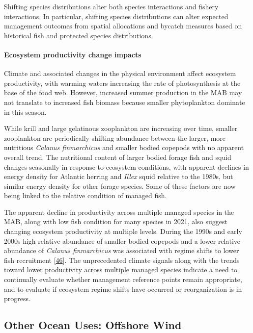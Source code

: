 \documentclass[
  10pt,
]{article}
\begin{document}
Shifting species distributions alter both species interactions and
fishery interactions. In particular, shifting species distributions can
alter expected management outcomes from spatial allocations and bycatch
measures based on historical fish and protected species distributions.

\hypertarget{ecosystem-productivity-change-impacts}{%
\paragraph{Ecosystem productivity change
impacts}\label{ecosystem-productivity-change-impacts}}

Climate and associated changes in the physical environment affect
ecosystem productivity, with warming waters increasing the rate of
photosynthesis at the base of the food web. However, increased summer
production in the MAB may not translate to increased fish biomass
because smaller phytoplankton dominate in this season.

While krill and large gelatinous zooplankton are increasing over time,
smaller zooplankton are periodically shifting abundance between the
larger, more nutritious \emph{Calanus finmarchicus} and smaller bodied
copepods with no apparent overall trend. The nutritional content of
larger bodied forage fish and squid changes seasonally in response to
ecosystem conditions, with apparent declines in energy density for
Atlantic herring and \emph{Illex} squid relative to the 1980s, but
similar energy density for other forage species. Some of these factors
are now being linked to the relative condition of managed fish.

The apparent decline in productivity across multiple managed species in
the MAB, along with low fish condition for many species in 2021, also
suggest changing ecosystem productivity at multiple levels. During the
1990s and early 2000s high relative abundance of smaller bodied copepods
and a lower relative abundance of \emph{Calanus finmarchicus} was
associated with regime shifts to lower fish recruitment
{[}\protect\hyperlink{ref-perretti_regime_2017}{46}{]}. The
unprecedented climate signals along with the trends toward lower
productivity across multiple managed species indicate a need to
continually evaluate whether management reference points remain
appropriate, and to evaluate if ecosystem regime shifts have occurred or
reorganization is in progress.

\hypertarget{other-ocean-uses-offshore-wind}{%
\subsection{Other Ocean Uses: Offshore
Wind}\label{other-ocean-uses-offshore-wind}}
\end{document}
